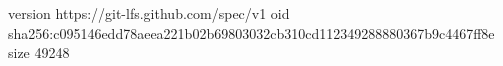 version https://git-lfs.github.com/spec/v1
oid sha256:c095146edd78aeea221b02b69803032cb310cd112349288880367b9c4467ff8e
size 49248
